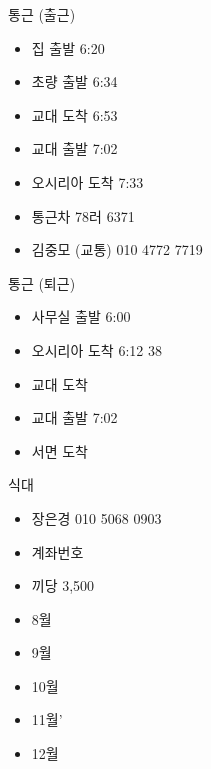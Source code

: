 \documentclass[aspectratio=1610,17pt,xcolor=pdftex,dvipsnames,table,handout]{beamer}
\begin{document}
		\begin{frame} [t,plain]
			\begin{block} {통근 (출근) }
			\begin{itemize}
  				\item 집 출발 6:20 
 				\item 초량 출발 6:34 
				\item 교대 도착 6:53
				\item 교대 출발 7:02
				\item 오시리아 도착 7:33
				\item 통근차 78러 6371  
				\item 김중모 (교통) 010 4772 7719 
 			\end{itemize}
			\end{block}
		\end{frame}


		\begin{frame} [t,plain]
			\begin{block} {통근 (퇴근) }
			\begin{itemize}
  				\item 사무실 출발 6:00 
 				\item 오시리아 도착  6:12 38 
				\item 교대 도착 
				\item 교대 출발 7:02
				\item 서면 도착 
 			\end{itemize}
			\end{block}
		\end{frame}



		\begin{frame} [t,plain]
			\begin{block} {식대}
			\begin{itemize}
  				\item 장은경 010 5068 0903 
 				\item 계좌번호 
				\item 끼당 3,500
				\item 8월 
				\item 9월 
				\item 10월 
				\item 11월'
				\item 12월 
 			\end{itemize}
			\end{block}
		\end{frame}


\end{document}
